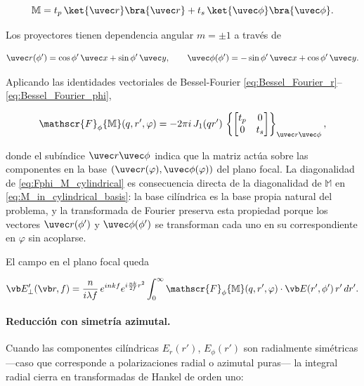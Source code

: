 \begin{equation}
  \mathbb{M}
  =
  t_p\,\ket{\uvec r}\bra{\uvec r}
  +
  t_s\,\ket{\uvec\phi}\bra{\uvec\phi}.
  \label{eq:M_in_cylindrical_basis}
\end{equation}

Los proyectores tienen dependencia angular $m=\pm 1$ a través de

\begin{equation}
\uvec r(\phi')
=
\cos\phi'\,\uvec x
+
\sin\phi'\,\uvec y,
\qquad
\uvec\phi(\phi')
=
-\sin\phi'\,\uvec x
+
\cos\phi'\,\uvec y.
\end{equation}

Aplicando las identidades vectoriales de Bessel-Fourier \eqref{eq:Bessel_Fourier_r}--\eqref{eq:Bessel_Fourier_phi},

\begin{equation}
  \mathscr{F}_\phi\{\mathbb{M}\}(q, r', \varphi)
  =
  -2\pi i\,J_1(qr')\,
  \left\{
    \begin{bmatrix}
      t_p & 0 \\
      0   & t_s
    \end{bmatrix}
  \right\}_{\uvec r\uvec\phi},
  \label{eq:Fphi_M_cylindrical}
\end{equation}

donde el subíndice $\uvec r\uvec\phi$ indica que la matriz actúa sobre las componentes en la base $(\uvec r(\varphi), \uvec\phi(\varphi))$ del plano focal. La diagonalidad de \eqref{eq:Fphi_M_cylindrical} es consecuencia directa de la diagonalidad de $\mathbb{M}$ en \eqref{eq:M_in_cylindrical_basis}: la base cilíndrica es la base propia natural del problema, y la transformada de Fourier preserva esta propiedad porque los vectores $\uvec r(\phi')$ y $\uvec\phi(\phi')$ se transforman cada uno en su correspondiente en $\varphi$ sin acoplarse.

El campo en el plano focal queda

\begin{equation}
  \vb E'_\perp(\vb r, f)
  =
  \frac{n}{i\lambda f}\,e^{inkf}e^{i\frac{nk}{2f}r^2}
  \int_0^\infty
  \mathscr{F}_\phi\{\mathbb{M}\}(q, r', \varphi)
  \cdot
  \vb E(r', \phi')\,r'\,dr'.
  \label{eq:E_field_general_cylindrical}
\end{equation}

\paragraph{Reducción con simetría azimutal.}
Cuando las componentes cilíndricas $E_r(r')$, $E_\phi(r')$ son radialmente simétricas —caso que corresponde a polarizaciones radial o azimutal puras— la integral radial cierra en transformadas de Hankel de orden uno:

